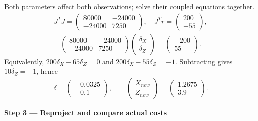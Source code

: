 \documentclass[letterpaper,11pt,english,openany,oneside]{jupyterBook}
\begin{document}
\begin{TextbookBox}
\sphinxAtStartPar
{} Both parameters affect both observations; solve their coupled equations together.
{\color{QuizMathBlue} \begin{equation*}
\begin{split}J^TJ=\begin{pmatrix}80000&-24000\\-24000&7250\end{pmatrix},\quad J^Tr=\begin{pmatrix}200\\-55\end{pmatrix},\end{split}
\end{equation*}}{\color{QuizMathBlue} \begin{equation*}
\begin{split}\begin{pmatrix}80000&-24000\\-24000&7250\end{pmatrix}\begin{pmatrix}\delta_X\\\delta_Z\end{pmatrix}=\begin{pmatrix}-200\\55\end{pmatrix}.\end{split}
\end{equation*}}
\sphinxAtStartPar
Equivalently, {\color{QuizMathBlue} \(200\delta_X-65\delta_Z=0\)} and {\color{QuizMathBlue} \(200\delta_X-55\delta_Z=-1\)}. Subtracting gives {\color{QuizMathBlue} \(10\delta_Z=-1\)}, hence
{\color{QuizMathBlue} \begin{equation*}
\begin{split}\delta=\begin{pmatrix}-0.0325\\-0.1\end{pmatrix},\qquad
\begin{pmatrix}X_{new}\\Z_{new}\end{pmatrix}=\begin{pmatrix}1.2675\\3.9\end{pmatrix}.\end{split}
\end{equation*}}
\par

\par\medskip{}
{\color{QuizStepRed}\bfseries Step 3 — Reproject and compare actual costs}\par\smallskip


\end{TextbookBox}
\end{document}
